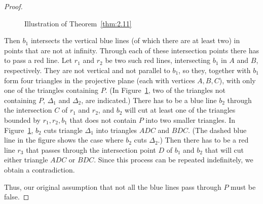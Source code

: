 \documentclass[a4paper,11pt,leqno]{article}
\begin{document}
\begin{proof}
\begin{figure}
\caption{Illustration of Theorem~\ref{thm:2.11}}\label{fig:MR}
\end{figure}
Then $b_1$ intersects the vertical blue lines (of which there are at least two) in points that are not at infinity.
Through each of these intersection points there has to pass a red line.
Let $r_1$ and $r_2$ be two such red lines, intersecting $b_1$ in $A$ and $B$, respectively.
They are not vertical and not parallel to $b_1$, so they, together with $b_1$ form four triangles in the projective plane (each with vertices $A,B,C$), with only one of the triangles containing $P$.
(In Figure~\ref{fig:MR}, two of the triangles not containing $P$, $\Delta_1$ and $\Delta_2$, are indicated.)
There has to be a blue line $b_2$ through the intersection $C$ of $r_1$ and $r_2$, and $b_2$ will cut at least one of the triangles bounded by $r_1,r_2,b_1$ that does not contain $P$ into two smaller triangles.
In Figure~\ref{fig:MR}, $b_2$ cuts triangle $\Delta_1$ into triangles $ADC$ and $BDC$.
(The dashed blue line in the figure shows the case where $b_2$ cuts $\Delta_2$.)
Then there has to be a red line $r_3$ that passes through the intersection point $D$ of $b_1$ and $b_2$ that will cut either triangle $ADC$ or $BDC$.
Since this process can be repeated indefinitely, we obtain a contradiction.

Thus, our original assumption that not all the blue lines pass through $P$ must be false.
\end{proof}
\end{document}

